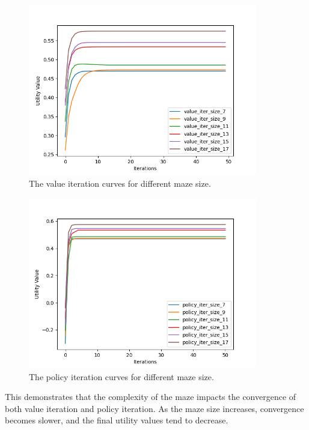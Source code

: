 \documentclass{article}
\begin{document}
\begin{figure}[H]
    \includegraphics[width=100mm]{../results/value_iteration_curves.png}
    \caption{The value iteration curves for different maze size.}
    \label{fig:value_iteration_convergence}
\end{figure}

\begin{figure}[H]
    \includegraphics[width=100mm]{../results/policy_iteration_curves.png}
    \caption{The policy iteration curves for different maze size.}
    \label{fig:policy_iteration_convergence}
\end{figure}

This demonstrates that the complexity of the maze impacts the convergence of both value iteration and policy iteration. As the maze size increases, convergence becomes slower, and the final utility values tend to decrease.
\end{document}
